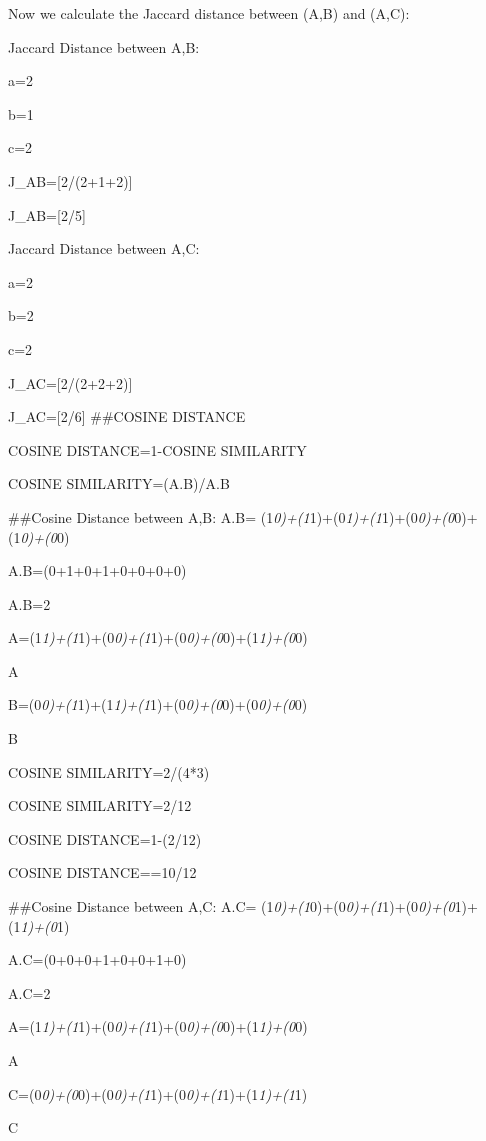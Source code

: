\documentclass[
]{article}
\begin{document}
Now we calculate the Jaccard distance between (A,B) and (A,C):

Jaccard Distance between A,B:

a=2

b=1

c=2

J\_AB={[}2/(2+1+2){]}

J\_AB={[}2/5{]}

Jaccard Distance between A,C:

a=2

b=2

c=2

J\_AC={[}2/(2+2+2){]}

J\_AC={[}2/6{]} \#\#COSINE DISTANCE

COSINE DISTANCE=1-COSINE SIMILARITY

COSINE
SIMILARITY=(A.B)/\textbar\textbar A\textbar\textbar.\textbar\textbar B\textbar\textbar{}

\#\#Cosine Distance between A,B: A.B=
(1\emph{0)+(1}1)+(0\emph{1)+(1}1)+(0\emph{0)+(0}0)+(1\emph{0)+(0}0)

A.B=(0+1+0+1+0+0+0+0)

A.B=2

\textbar\textbar A\textbar\textbar=(1\emph{1)+(1}1)+(0\emph{0)+(1}1)+(0\emph{0)+(0}0)+(1\emph{1)+(0}0)

\textbar\textbar A\textbar{}

\textbar\textbar B\textbar\textbar=(0\emph{0)+(1}1)+(1\emph{1)+(1}1)+(0\emph{0)+(0}0)+(0\emph{0)+(0}0)

\textbar\textbar B\textbar{}

COSINE SIMILARITY=2/(4*3)

COSINE SIMILARITY=2/12

COSINE DISTANCE=1-(2/12)

COSINE DISTANCE==10/12

\#\#Cosine Distance between A,C: A.C=
(1\emph{0)+(1}0)+(0\emph{0)+(1}1)+(0\emph{0)+(0}1)+(1\emph{1)+(0}1)

A.C=(0+0+0+1+0+0+1+0)

A.C=2

\textbar\textbar A\textbar\textbar=(1\emph{1)+(1}1)+(0\emph{0)+(1}1)+(0\emph{0)+(0}0)+(1\emph{1)+(0}0)

\textbar\textbar A\textbar{}

\textbar\textbar C\textbar\textbar=(0\emph{0)+(0}0)+(0\emph{0)+(1}1)+(0\emph{0)+(1}1)+(1\emph{1)+(1}1)

\textbar\textbar C\textbar{}
\end{document}
